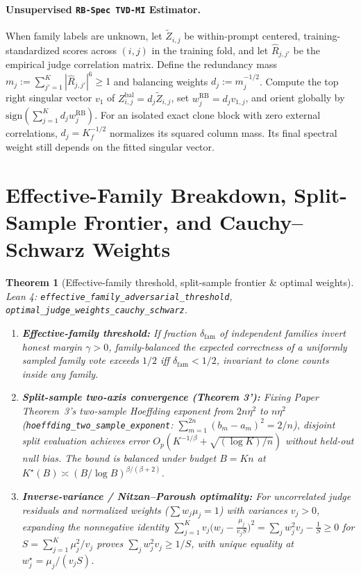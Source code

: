 \documentclass[11pt]{article}
\theoremstyle{plain}
\newtheorem{theorem}{Theorem}[section]
\theoremstyle{definition}
\theoremstyle{remark}
\newcommand{\lident}[1]{{\small\texttt{#1}}}
\begin{document}
\paragraph{Unsupervised \texttt{RB-Spec TVD-MI} Estimator.}
When family labels are unknown, let $\widetilde{Z}_{i,j}$ be within-prompt
centered, training-standardized scores across $(i,j)$ in the training fold, and let
$\widehat{R}_{j,j'}$ be the empirical judge correlation matrix. Define the
redundancy mass $m_j := \sum_{j'=1}^K |\widehat{R}_{j,j'}|^6 \ge 1$ and balancing
weights $d_j := m_j^{-1/2}$. Compute the top right singular vector $v_1$ of
$Z^{\mathrm{bal}}_{i,j} = d_j \widetilde{Z}_{i,j}$, set $w^{\mathrm{RB}}_j = d_j v_{1,j}$,
and orient globally by $\mathrm{sign}(\sum_{j=1}^K d_j w^{\mathrm{RB}}_j)$. For an isolated exact clone block with zero external correlations, $d_j=K_f^{-1/2}$ normalizes its squared column mass. Its final spectral weight still depends on the fitted singular vector.

\section{Effective-Family Breakdown, Split-Sample Frontier, and Cauchy--Schwarz Weights}

\begin{theorem}[Effective-family threshold, split-sample frontier \& optimal weights]
\noindent\textit{Lean 4:} \lident{effective\_\allowbreak family\_\allowbreak adversarial\_\allowbreak threshold},
\lident{optimal\_\allowbreak judge\_\allowbreak weights\_\allowbreak cauchy\_\allowbreak schwarz}.\par\medskip
\begin{enumerate}[leftmargin=*,itemsep=3pt]
  \item \textbf{Effective-family threshold:} If fraction $\delta_{\mathrm{fam}}$ of
    independent families invert honest margin $\gamma > 0$, family-balanced
    the expected correctness of a uniformly sampled family vote exceeds $1/2$ iff $\delta_{\mathrm{fam}} < 1/2$, invariant to clone counts
    inside any family.
  \item \textbf{Split-sample two-axis convergence (Theorem 3'):} Fixing Paper
    Theorem~3's two-sample Hoeffding exponent from $2n\eta^2$ to $n\eta^2$
    (\texttt{hoeffding\_two\_sample\_exponent}: $\sum_{m=1}^{2n}(b_m-a_m)^2 = 2/n$),
    disjoint split evaluation achieves error $O_p(K^{-1/\beta} + \sqrt{(\log K)/n})$
    without held-out null bias. The bound is balanced under budget $B = Kn$ at $K^\star(B) \asymp (B/\log B)^{\beta/(\beta+2)}$.
  \item \textbf{Inverse-variance / Nitzan--Paroush optimality:} For uncorrelated judge residuals and normalized weights
    ($\sum w_j \mu_j = 1$) with variances $v_j > 0$, expanding the nonnegative
    identity $\sum_{j=1}^K v_j\big(w_j - \frac{\mu_j}{v_j S}\big)^2 = \sum_j w_j^2 v_j - \frac{1}{S} \ge 0$
    for $S = \sum_{j=1}^K \mu_j^2 / v_j$ proves $\sum_j w_j^2 v_j \ge 1/S$, with
    unique equality at $w_j^\star = \mu_j / (v_j S)$.
\end{enumerate}
\end{theorem}
\end{document}
